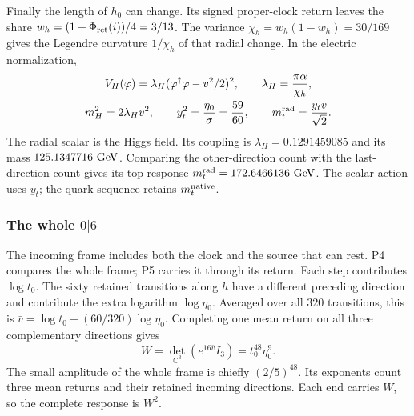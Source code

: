 \documentclass[aps,prx,reprint,longbibliography]{revtex4-2}
\providecommand{\Phis}{\Phi_{\rm ret}}
\begin{document}
Finally the length of $h_0$ can change. Its signed proper-clock return leaves the share $w_h=(1+\Phis(i))/4=3/13$. The variance $\chi_h=w_h(1-w_h)=30/169$ gives the Legendre curvature $1/\chi_h$ of that radial change. In the electric normalization,
\begin{equation}
 \begin{gathered}
 V_H(\varphi)=\lambda_H(\varphi^\dagger\varphi-v^2/2)^2,
 \qquad\lambda_H=\frac{\pi\alpha}{\chi_h},\\
 m_H^2=2\lambda_Hv^2,\qquad
 y_t^2=\frac{\eta_0}{\sigma}=\frac{59}{60},\qquad
 m_t^{\rm rad}=\frac{y_tv}{\sqrt2}.
 \end{gathered}
 \label{eq:higgs_top}
\end{equation}
The radial scalar is the Higgs field. Its coupling is $\lambda_H=0.1291459085$ and its mass $125.1347716\ {\rm GeV}$. Comparing the other-direction count with the last-direction count gives its top response $m_t^{\rm rad}=172.6466136\ {\rm GeV}$. The scalar action uses $y_t$; the quark sequence retains $m_t^{\rm native}$.

\subsubsection{The whole \texorpdfstring{$0|6$}{0|6}}
\label{sec:whole}

The incoming frame includes both the clock and the source that can rest. P4 compares the whole frame; P5 carries it through its return. Each step contributes $\log t_0$. The sixty retained transitions along $h$ have a different preceding direction and contribute the extra logarithm $\log\eta_0$. Averaged over all $320$ transitions, this is $\bar v=\log t_0+(60/320)\log\eta_0$. Completing one mean return on all three complementary directions gives
\begin{equation}
 \boxed{W=\det_{\mathbb C^3}(e^{16\bar v}I_3)=t_0^{48}\eta_0^9}.
 \label{eq:W}
\end{equation}
The small amplitude of the whole frame is chiefly $(2/5)^{48}$. Its exponents count three mean returns and their retained incoming directions. Each end carries $W$, so the complete response is $W^2$.
\end{document}
